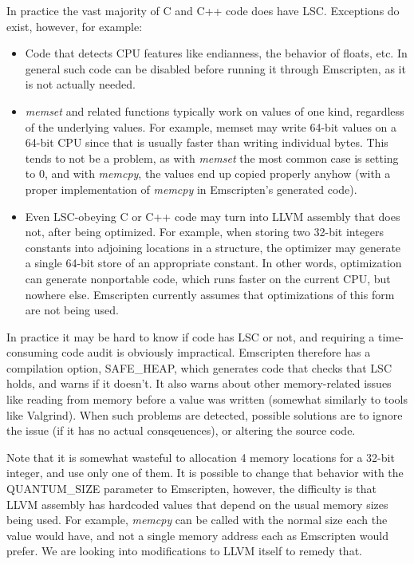 \documentclass[11pt]{proc}
\begin{document}
In practice the vast majority of C and C++ code does have LSC. Exceptions
do exist, however, for example:
\begin{itemize}
\item Code that detects CPU features like endianness, the behavior of floats, etc. In general such code can be disabled
      before running it through Emscripten, as it is not actually needed.
\item \emph{memset} and related functions typically work on values of one kind,
      regardless of the underlying values. For example, memset may write 64-bit
      values on a 64-bit CPU since that is usually faster than writing individual
      bytes. This tends to
      not be a problem, as with \emph{memset} the most common case is setting to
      0, and with \emph{memcpy}, the values end up copied properly anyhow (with
      a proper implementation of \emph{memcpy} in Emscripten's generated code).
\item Even LSC-obeying C or C++ code may turn into LLVM assembly that does not,
      after being optimized. For example, when storing two 32-bit integers constants into
      adjoining locations in a structure, the optimizer may generate a single
      64-bit store of an appropriate constant. In other words, optimization can
      generate nonportable code, which runs faster on the current CPU, but
      nowhere else. Emscripten currently assumes that optimizations of this form
      are not being used.
\end{itemize}
In practice it may be hard to know if code has LSC or not, and requiring
a time-consuming code audit is obviously impractical. Emscripten therefore has
a compilation option, SAFE\_HEAP, which generates code that checks that LSC holds, and warns if it
doesn't. It also warns about other memory-related issues like
reading from memory before a value was written (somewhat similarly to tools
like Valgrind). When such problems are detected, possible solutions are to ignore the issue (if it has no actual
consqeuences), or altering the source code.

Note that it is somewhat wasteful to allocation 4 memory locations for
a 32-bit integer, and use only one of them. It is possible to change
that behavior with the QUANTUM\_SIZE parameter to Emscripten, however,
the difficulty is that LLVM assembly has hardcoded values that depend on
the usual memory sizes being used. For example, \emph{memcpy} can be
called with the normal size each the value would have, and not a single
memory address each as Emscripten would prefer. We are looking into modifications
to LLVM itself to remedy that.
\end{document}
